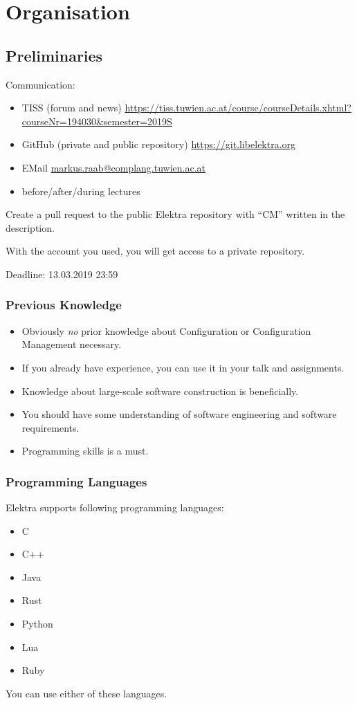 \section{Organisation}

\subsection{Preliminaries}
\begin{frame}
	Communication:
	\begin{itemize}
		\item TISS (forum and news) \url{https://tiss.tuwien.ac.at/course/courseDetails.xhtml?courseNr=194030&semester=2019S}
		\item GitHub (private and public repository) \url{https://git.libelektra.org}
		\item EMail \url{markus.raab@complang.tuwien.ac.at}
		\item before/after/during lectures
	\end{itemize}
\end{frame}

\begin{assignment}
	\begin{task}
	Create a pull request to the public Elektra repository with ``CM'' written in the description.
	\end{task}
	With the account you used, you will get access to a private repository.

	Deadline: 13.03.2019 23:59
\end{assignment}

\begin{frame}
	\frametitle{Previous Knowledge}
	\begin{itemize}
		\item Obviously \textit{no} prior knowledge about Configuration or Configuration Management necessary.
		\item If you already have experience, you can use it in your talk and assignments.
		\item Knowledge about large-scale software construction is beneficially.
		\item You should have some understanding of software engineering and software requirements.
		\item Programming skills is a must.
	\end{itemize}
\end{frame}

\begin{frame}
	\frametitle{Programming Languages}
	Elektra supports following programming languages:
	\begin{itemize}
		\item C
		\item C++
		\item Java
		\item Rust
		\item Python
		\item Lua
		\item Ruby
	\end{itemize}
	You can use either of these languages.
\end{frame}

